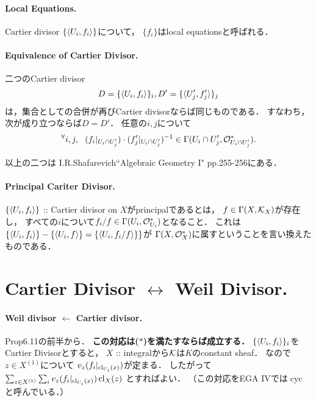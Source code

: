 \documentclass[a4paper]{jsarticle}
\begin{document}
    \paragraph{Local Equations.}
    Cartier divisor $\{\langle U_i,f_i \rangle\}$について，
    $\{ f_i \}$はlocal equationsと呼ばれる．

    \paragraph{Equivalence of Cartier Divisor.}
    二つのCartier divisor 
    \[ D=\{\langle U_i,f_i \rangle\}_i, D'=\{\langle U'_j,f'_j \rangle\}_j \]
    は，集合としての合併が再びCartier divisorならば同じものである．
    すなわち，次が成り立つならば$D=D'$．
    任意の$i,j$について
    \[
        {}^{\forall} i, j,~~
        (f_i|_{U_i \cap U'_j}) \cdot (f'_j|_{U_i \cap U'_j})^{-1}
            \in \Gamma(U_i \cap U'_j, \mathcal{O}_{U_i \cap U'_j}^*).
    \]

    以上の二つは I.R.Shafarevich``Algebraic Geometry I" pp.255-256にある．

    \paragraph{Principal Cariter Divisor.}
    $\{\langle U_i,f_i \rangle\}$ :: Cartier divisor on $X$がprincipalであるとは，
    $f \in \Gamma(X, \mathcal{K}_X)$が存在し，
    すべての$i$について$f_i/f \in \Gamma(U_i, \mathcal{O}_{U_i}^*)$となること．
    これは$\{\langle U_i,f_i \rangle\}-\{\langle U_i,f \rangle\}=\{\langle U_i,f_i/f \rangle\}\}$が
    $\Gamma(X, \mathcal{O}_X^*)$に属すということを言い換えたものである．

\section{Cartier Divisor $\leftrightarrow$ Weil Divisor.}

    \paragraph{Weil divisor $\leftarrow$ Cartier divisor.}
    Prop6.11の前半から．
    \textbf{この対応は($*$)を満たすならば成立する．}
    $\{\langle U_i,f_i \rangle\}_i$をCartier Divisorとすると，
    $X$ :: integralから$\mathcal{K}$は$K$のconstant sheaf．
    なので$z \in X^{(1)}$について
    $v_z(f_i|_{\operatorname{cl}_{U_i}(x)})$が定まる．
    したがって
    $\sum_{z \in X^{(1)}} \sum_{i} v_z(f_i|_{\operatorname{cl}_{U_i}(x)}) \operatorname{cl}_X(z)$
    とすればよい．
    （この対応をEGA IVでは$\operatorname{cyc}$と呼んでいる．）
\end{document}
